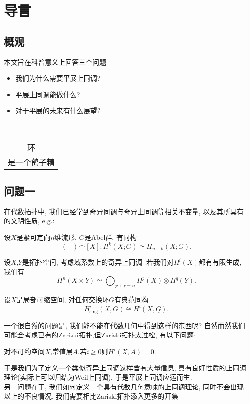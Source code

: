 
\chapter*{导言}	%
\section*{概观}
本文旨在科普意义上回答三个问题:
\begin{itemize}
    \item 我们为什么需要平展上同调?
    \item 平展上同调能做什么?
    \item 对于平展的未来有什么展望?
\end{itemize}\
\begin{flushright}\begin{minipage}{0.3 \textwidth}
	\begin{tabular}{c}
		{\kaishu 环} \\
		是一个鸽子精
	\end{tabular}
\end{minipage}\end{flushright}
\vspace{1em}
\section{问题一}
在代数拓扑中, 我们已经学到奇异同调与奇异上同调等相关不变量, 以及其所具有的文明性质, e.g.:
\begin{theorem}
设$X$是紧可定向$n$维流形, $G$是Abel群, 有同构
\begin{equation*}
    (-)\frown [X]: H^k(X;G)\simeq H_{n-k}(X;G).
\end{equation*}
\end{theorem}
\begin{theorem}[K\"unneth公式]设$X$,$Y$是拓扑空间, 考虑域系数上的奇异上同调, 若我们对$H^i(X)$都有有限生成, 我们有
\begin{equation*}
    H^n(X\times Y) \simeq \bigoplus_{p+q=n}H^p(X)\otimes H^q(Y).
\end{equation*}
    
\end{theorem}
\begin{theorem}[奇异常值比较] 设$X$是局部可缩空间, 对任何交换环$G$有典范同构
\begin{equation*}
    H^i_{\text{sing}}(X,G) \cong H^i(X,\underline{G}).
\end{equation*}
    
\end{theorem}
一个很自然的问题是, 我们能不能在代数几何中得到这样的东西呢? 自然而然我们可能会考虑已有的Zariski拓扑,但Zariski拓扑太过松, 有以下问题:
\begin{theorem}
    对不可约空间$X$,常值层$A$,若$i \geq 0$则$H^i(X,A)=0$.
\end{theorem}
于是我们为了定义一个类似奇异上同调这样含有大量信息, 具有良好性质的上同调理论(实际上可以归结为Weil上同调), 于是平展上同调应运而生.\\
另一问题在于, 我们如何定义一个具有代数几何意味的上同调理论, 同时不会出现以上的不良情况, 我们需要相比Zariski拓扑添入更多的开集
